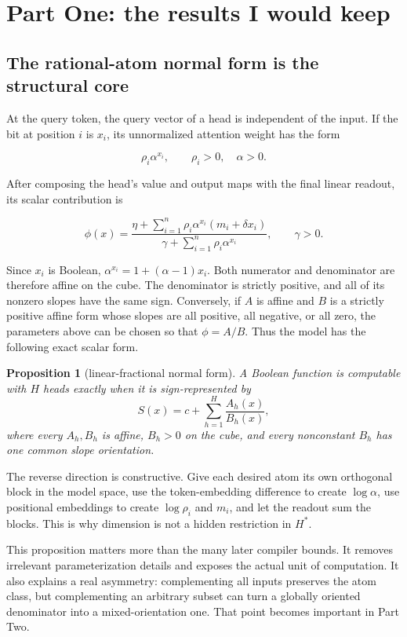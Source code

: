 \documentclass[10pt]{article}
\newtheorem{proposition}[theorem]{Proposition}
\theoremstyle{definition}
\theoremstyle{remark}
\newcommand{\Hstar}{H^{\ast}}
\begin{document}
\section{Part One: the results I would keep}

\subsection{The rational-atom normal form is the structural core}

At the query token, the query vector of a head is independent of the input. If the bit at
position $i$ is $x_i$, its unnormalized attention weight has the form

\[
\rho_i\alpha^{x_i}, \qquad \rho_i>0,\quad \alpha>0.
\]

After composing the head's value and output maps with the final linear readout, its scalar
contribution is

\[
\phi(x)=
\frac{\eta+\sum_{i=1}^n\rho_i\alpha^{x_i}(m_i+\delta x_i)}
{\gamma+\sum_{i=1}^n\rho_i\alpha^{x_i}},
\qquad \gamma>0.
\]

Since $x_i$ is Boolean, $\alpha^{x_i}=1+(\alpha-1)x_i$. Both numerator and
denominator are therefore affine on the cube. The denominator is strictly positive, and
all of its nonzero slopes have the same sign. Conversely, if $A$ is affine and $B$ is a
strictly positive affine form whose slopes are all positive, all negative, or all zero,
the parameters above can be chosen so that $\phi=A/B$. Thus the model has the following
exact scalar form.

\begin{proposition}[linear-fractional normal form]
A Boolean function is computable with $H$ heads exactly when it is sign-represented by
\[
S(x)=c+\sum_{h=1}^{H}\frac{A_h(x)}{B_h(x)},
\]
where every $A_h,B_h$ is affine, $B_h>0$ on the cube, and every nonconstant $B_h$
has one common slope orientation.
\end{proposition}

The reverse direction is constructive. Give each desired atom its own orthogonal block in
the model space, use the token-embedding difference to create $\log\alpha$, use positional
embeddings to create $\log\rho_i$ and $m_i$, and let the readout sum the blocks. This is
why dimension is not a hidden restriction in $\Hstar$.

This proposition matters more than the many later compiler bounds. It removes irrelevant
parameterization details and exposes the actual unit of computation. It also explains a
real asymmetry: complementing all inputs preserves the atom class, but complementing an
arbitrary subset can turn a globally oriented denominator into a mixed-orientation one.
That point becomes important in Part Two.
\end{document}
